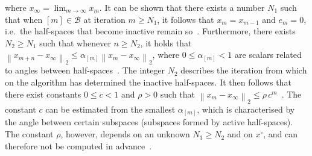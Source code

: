 \documentclass[onecolumn]{autart}
\newcommand{\twonorm}[1]{\left\| #1 \right\|_2}
\begin{document}
where $x_\infty=\lim_{m\rightarrow\infty}x_m$. It can be shown that there exists a number $N_1$ such that when $[m]\in \mathcal{B}$ at iteration $m\geq N_1$, it follows that $x_m=x_{m-1}$ and $e_m=0$, i.e.\ the half-spaces that become inactive remain so~\cite[Lemma~3.1]{DYKSTRAPOLY}. Furthermore, there exists $N_2\geq N_1$ such that whenever $n\geq N_2$, it holds that $\twonorm{x_{m+n}-x_\infty}\leq\alpha_{[m]}\twonorm{x_m-x_\infty}$, where $0\leq\alpha_{[m]}<1$ are scalars related to angles between half-spaces~\cite[Lemma~3.7]{DYKSTRAPOLY}. The integer $N_2$ describes the iteration from which on the algorithm has determined the inactive half-spaces. It then follows that there exist constants $0\leq c < 1$ and $\rho > 0$ such that $\twonorm{x_m -x_\infty} \leq \rho\, c^m$~\cite[Thm.~3.8]{DYKSTRAPOLY}. The constant $c$ can be estimated from the smallest $\alpha_{[m]}$, which is characterised by the angle between certain subspaces (subspaces formed by active half-spaces). The constant $\rho$, however, depends on an unknown $N_3\geq N_2$ and on $x^\circ$, and can therefore not be computed in advance~\cite{DYKSTRAPERKINS,XUPOLY}. %

\end{document}
